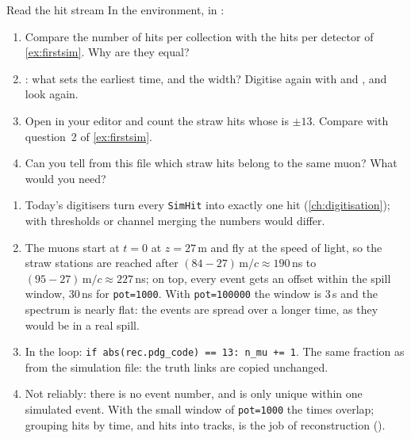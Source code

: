 
\begin{exercise}{Read the hit stream}
\label{ex:firstdigi}
In the  environment, in :
\begin{enumerate}
  \item Compare the number of hits per collection with the hits per
        detector of \cref{ex:firstsim}. Why are they equal?
  \item {}: what sets the earliest time, and the width?
        Digitise again with  and
        , and look again.
  \item Open  in your editor and count the straw hits
        whose  is $$. Compare with question~2 of
        \cref{ex:firstsim}.
  \item Can you tell from this file which straw hits belong to the same
        muon? What would you need?
\end{enumerate}
\end{exercise}

\begin{solution}
\begin{enumerate}
  \item Today's digitisers turn every \texttt{SimHit} into exactly one hit
        (\cref{ch:digitisation}); with thresholds or channel merging the
        numbers would differ.
  \item The muons start at $t=0$ at $z=27$\,m and fly at the speed of light,
        so the straw stations are reached after $(84-27)\,/c
        $\,ns to $(95-27)\,/c $\,ns; on top,
        every event gets an offset within the spill window, 30\,ns for
        \texttt{pot=1000}. With \texttt{pot=100000} the window is 3\,\textmu s
        and the spectrum is nearly flat: the events are spread over a longer
        time, as they would be in a real spill.
  \item In the loop: \texttt{if abs(rec.pdg\_code) == 13: n\_mu += 1}. The
        same fraction as from the simulation file: the truth links are
        copied unchanged.
  \item Not reliably: there is no event number, and  is only
        unique within one simulated event. With the small window of
        \texttt{pot=1000} the times overlap; grouping hits by time, and
        hits into tracks, is the job of reconstruction ().
\end{enumerate}
\end{solution}


